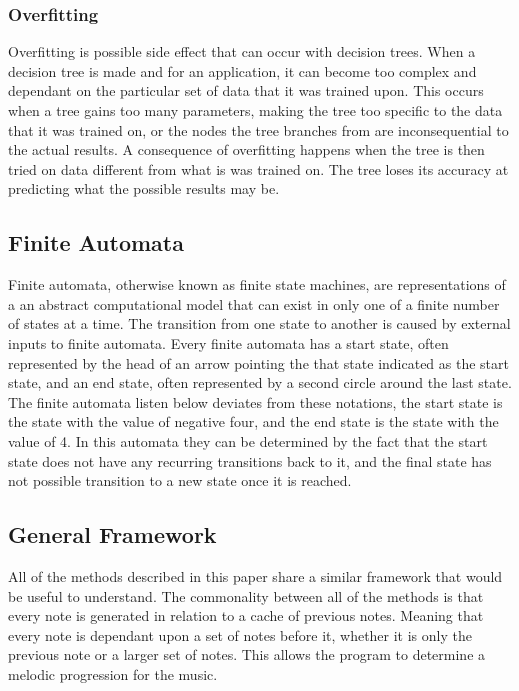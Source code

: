 \documentclass{sig-alternate}
\begin{document}
\subsubsection{Overfitting}
\label{sec:overfitting}
	Overfitting is possible side effect that can occur with decision trees. When a decision tree is made and for an application, it can become too complex and dependant on the particular set of data that it was trained upon. This occurs when a tree gains too many parameters, making the tree too specific to the data that it was trained on, or the nodes the tree branches from are inconsequential to the actual results. A consequence of overfitting happens when the tree is then tried on data different from what is was trained on. The tree loses its accuracy at predicting what the possible results may be.
\subsection{Finite Automata}
\label{sec:finiteautomata}
	Finite automata, otherwise known as finite state machines, are representations of a an abstract computational model that can exist in only one of a finite number of states at a time. The transition from one state to another is caused by external inputs to finite automata. Every finite automata has a start state, often represented by the head of an arrow pointing the that state indicated as the start state, and an end state, often represented by a second circle around the last state. The finite automata listen below deviates from these notations, the start state is the state with the value of negative four, and the end state is the state with the value of 4. In this automata they can be determined by the fact that the start state does not have any recurring transitions back to it, and the final state has not possible transition to a new state once it is reached.
\subsection{General Framework}
\label{sec:framework}
	All of the methods described in this paper share a similar framework that would be useful to understand. The commonality between all of the methods is that every note is generated in relation to a cache of previous notes. Meaning that every note is dependant upon a set of notes before it, whether it is only the previous note or a larger set of notes. This allows the program to determine a melodic progression for the music.
\end{document}
